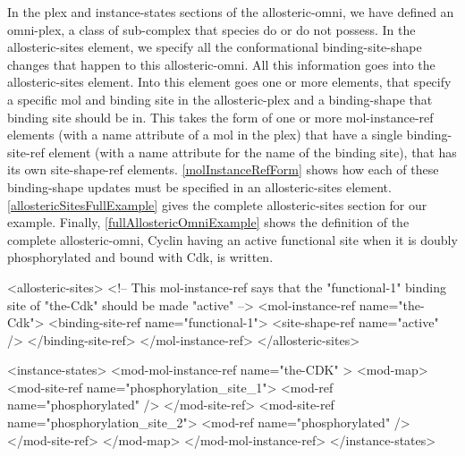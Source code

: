 In the plex and instance-states sections of the allosteric-omni, we
have defined an omni-plex, a class of sub-complex that species do or
do not possess.  In the allosteric-sites element, we specify all the
conformational binding-site-shape changes that happen to this
allosteric-omni.  All this information goes into the allosteric-sites
element.  Into this element goes one or more elements, that specify a
specific mol and binding site in the allosteric-plex and a
binding-shape that binding site should be in.  This takes the form of
one or more mol-instance-ref elements (with a name attribute of a mol
in the plex) that have a single binding-site-ref element (with a name
attribute for the name of the binding site), that has its own
site-shape-ref elements.  \ref{molInstanceRefForm} shows how each of
these binding-shape updates must be specified in an allosteric-sites
element.  \ref{allostericSitesFullExample} gives the complete
allosteric-sites section for our example.  Finally,
\ref{fullAllostericOmniExample} shows the definition of the complete
allosteric-omni, Cyclin having an active functional site when it is
doubly phosphorylated and bound with Cdk, is written.

\begin{ExampleXML}[caption=Each mol-instance-ref subelement describes a single binding site update., label=molInstanceRefForm]
<allosteric-sites>
  <!-- This mol-instance-ref says that the "functional-1" binding site of
       "the-Cdk" should be made "active" -->
  <mol-instance-ref name="the-Cdk">
    <binding-site-ref name="functional-1">
      <site-shape-ref name="active" />
    </binding-site-ref>
  </mol-instance-ref>
</allosteric-sites>
\end{ExampleXML}

\begin{ExampleXML}[caption= someexample, label=allostericSitesFullExample]
<instance-states>
  <mod-mol-instance-ref name="the-CDK" >
    <mod-map>
      <mod-site-ref name="phosphorylation_site_1">
	<mod-ref name="phosphorylated" />
      </mod-site-ref>
      <mod-site-ref name="phosphorylation_site_2">
	<mod-ref name="phosphorylated" />
      </mod-site-ref>
    </mod-map>
  </mod-mol-instance-ref>
</instance-states>
\end{ExampleXML}

